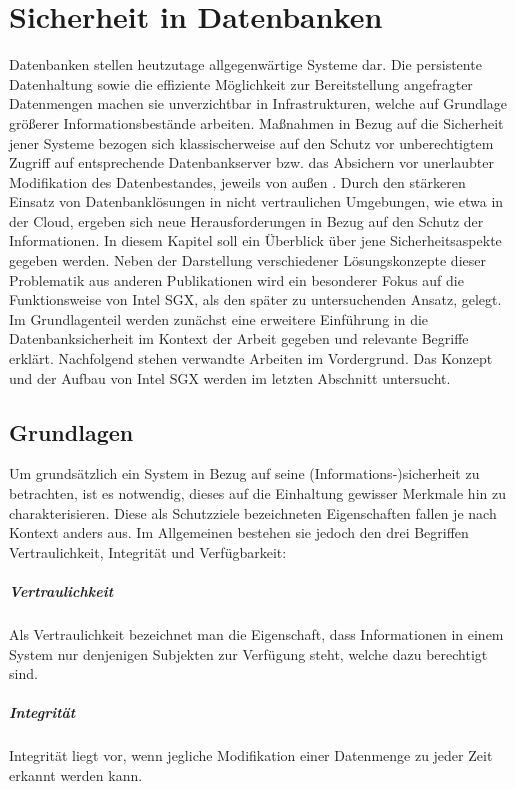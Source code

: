 \chapter{Sicherheit in Datenbanken}
Datenbanken stellen heutzutage allgegenwärtige Systeme dar. Die persistente Datenhaltung sowie die effiziente Möglichkeit zur Bereitstellung angefragter Datenmengen machen sie unverzichtbar in Infrastrukturen, welche auf Grundlage größerer Informationsbestände arbeiten. Maßnahmen in Bezug auf die Sicherheit jener Systeme bezogen sich klassischerweise auf den Schutz vor unberechtigtem Zugriff auf entsprechende Datenbankserver bzw. das Absichern vor unerlaubter Modifikation des Datenbestandes, jeweils von außen \cite{BSI1}. Durch den stärkeren Einsatz von Datenbanklösungen in nicht vertraulichen Umgebungen, wie etwa in der Cloud, ergeben sich neue Herausforderungen in Bezug auf den Schutz der Informationen. In diesem Kapitel soll ein Überblick über jene Sicherheitsaspekte gegeben werden. Neben der Darstellung verschiedener Lösungskonzepte dieser Problematik aus anderen Publikationen wird ein besonderer Fokus auf die Funktionsweise von Intel SGX, als den später zu untersuchenden Ansatz, gelegt. Im Grundlagenteil werden zunächst eine erweitere Einführung in die Datenbanksicherheit im Kontext der Arbeit gegeben und relevante Begriffe erklärt. Nachfolgend stehen verwandte Arbeiten im Vordergrund. Das Konzept und der Aufbau von Intel SGX werden im letzten Abschnitt untersucht.

\section{Grundlagen}
Um grundsätzlich ein System in Bezug auf seine (Informations-)sicherheit zu betrachten, ist es notwendig, dieses auf die Einhaltung gewisser Merkmale hin zu charakterisieren. Diese als Schutzziele bezeichneten Eigenschaften fallen je nach Kontext anders aus. Im Allgemeinen bestehen sie jedoch den drei Begriffen Vertraulichkeit, Integrität und Verfügbarkeit:

\paragraph{Vertraulichkeit}
Als Vertraulichkeit bezeichnet man die Eigenschaft, dass Informationen in einem System nur denjenigen Subjekten zur Verfügung steht, welche dazu berechtigt sind.

\paragraph{Integrität}
Integrität liegt vor, wenn jegliche Modifikation einer Datenmenge zu jeder Zeit erkannt werden kann.

